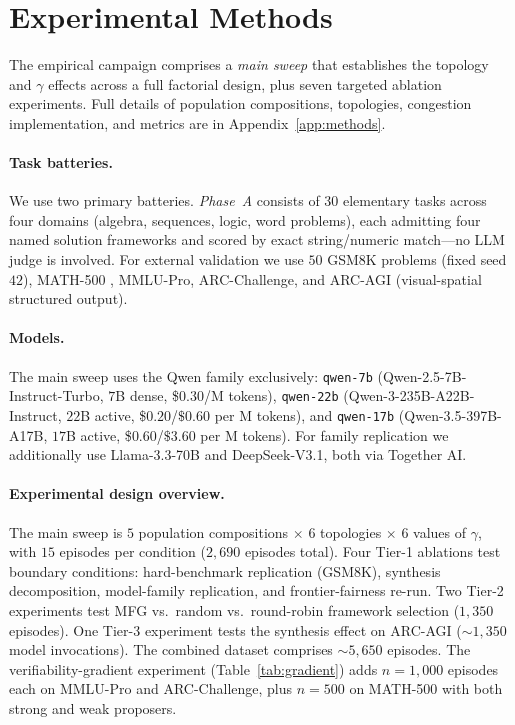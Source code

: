 \documentclass[11pt]{amsart}
\newcommand{\g}{\gamma}
\newcommand\1{{\mathds{1}}}
\theoremstyle{definition}
\theoremstyle{remark}
\numberwithin{equation}{section}
\begin{document}
\section{Experimental Methods}\label{sec:methods}

The empirical campaign comprises a \emph{main sweep} that establishes the topology and $\g$ effects across a full factorial design, plus seven targeted ablation experiments.
Full details of population compositions, topologies, congestion implementation, and metrics are in Appendix~\ref{app:methods}.

\paragraph{Task batteries.}
We use two primary batteries.
\emph{Phase~A} consists of $30$ elementary tasks across four domains (algebra, sequences, logic, word problems), each admitting four named solution frameworks and scored by exact string/numeric match---no LLM judge is involved.
For external validation we use $50$ GSM8K problems \cite{Cobbe2021GSM8K} (fixed seed $42$), MATH-500 \cite{Hendrycks2021MATH}, MMLU-Pro, ARC-Challenge, and ARC-AGI \cite{Chollet2019ARC} (visual-spatial structured output).

\paragraph{Models.}
The main sweep uses the Qwen family exclusively: \texttt{qwen-7b} (Qwen-2.5-7B-Instruct-Turbo, $7$B dense, \$$0.30$/M tokens), \texttt{qwen-22b} (Qwen-3-235B-A22B-Instruct, $22$B active, \$$0.20$/$\$0.60$ per M tokens), and \texttt{qwen-17b} (Qwen-3.5-397B-A17B, $17$B active, \$$0.60$/$\$3.60$ per M tokens).
For family replication we additionally use Llama-3.3-70B and DeepSeek-V3.1, both via Together AI.

\paragraph{Experimental design overview.}
The main sweep is $5$ population compositions $\times$ $6$ topologies $\times$ $6$ values of $\g$, with $15$ episodes per condition ($2{,}690$ episodes total).
Four Tier-1 ablations test boundary conditions: hard-benchmark replication (GSM8K), synthesis decomposition, model-family replication, and frontier-fairness re-run.
Two Tier-2 experiments test MFG vs.\ random vs.\ round-robin framework selection ($1{,}350$ episodes).
One Tier-3 experiment tests the synthesis effect on ARC-AGI ($\sim\!1{,}350$ model invocations).
The combined dataset comprises $\sim\!5{,}650$ episodes.
The verifiability-gradient experiment (Table~\ref{tab:gradient}) adds $n\!=\!1{,}000$ episodes each on MMLU-Pro and ARC-Challenge, plus $n\!=\!500$ on MATH-500 with both strong and weak proposers.
\end{document}
